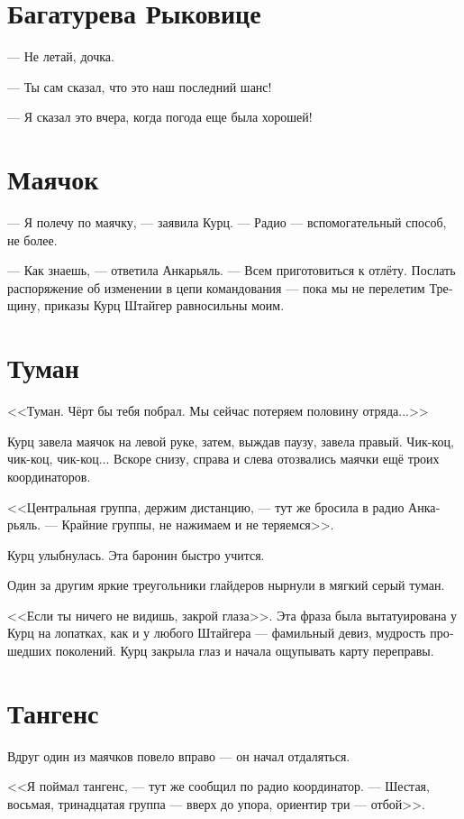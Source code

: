 \documentclass[a4paper,10pt,fleqn]{book}\usepackage{polyglossia}\setdefaultlanguage[babelshorthands=true]{russian}\setotherlanguage{english}\defaultfontfeatures{Ligatures=TeX,Mapping=tex-text}\usepackage{xcolor}\newcommand{\ml}[3]{#2}
\begin{document}
\section{Багатурева Рыковице}

--- Не летай, дочка.

--- Ты сам сказал, что это наш последний шанс!

--- Я сказал это вчера, когда погода еще была хорошей!

\section{Маячок}

--- Я полечу по маячку, --- заявила Курц.
--- Радио --- вспомогательный способ, не более.

--- Как знаешь, --- ответила Анкарьяль.
--- Всем приготовиться к отлёту.
Послать распоряжение об изменении в цепи командования --- пока мы не перелетим Трещину, приказы Курц Штайгер равносильны моим.

\section{Туман}

<<Туман.
Чёрт бы тебя побрал.
Мы сейчас потеряем половину отряда...>>

Курц завела маячок на левой руке, затем, выждав паузу, завела правый.
Чик-коц, чик-коц, чик-коц...
Вскоре снизу, справа и слева отозвались маячки ещё троих координаторов.

<<Центральная группа, держим дистанцию, --- тут же бросила в радио Анкарьяль.
--- Крайние группы, не нажимаем и не теряемся>>.

Курц улыбнулась.
Эта баронин быстро учится.

Один за другим яркие треугольники глайдеров нырнули в мягкий серый туман.

<<Если ты ничего не видишь, закрой глаза>>.
Эта фраза была вытатуирована у Курц на лопатках, как и у любого Штайгера --- фамильный девиз, мудрость прошедших поколений.
Курц закрыла глаз и начала ощупывать карту переправы.

\section{Тангенс}

Вдруг один из маячков повело вправо --- он начал отдаляться.

<<Я поймал тангенс, --- тут же сообщил по радио координатор.
\ml{$0$}
{--- Шестая, восьмая, тринадцатая группа --- вверх до упора, ориентир три --- отбой>>.}
{``Group six, eight, thirteen, full up, beacon three is off.''}
\end{document}
